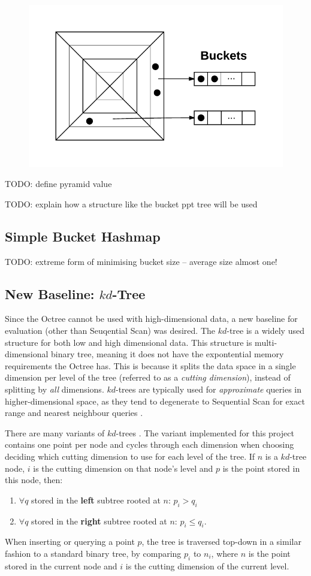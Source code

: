 \begin{figure}
\begin{center}
\begin{subfloat} {%
				\includegraphics[scale=0.5]{figures/pyramid_tree_buckets.pdf}
			}
			\end{subfloat}
		\end{center}

		\label{fig:pyramid-tree-partition}
\end{figure}

TODO: define pyramid value

TODO: explain how a structure like the bucket ppt tree will be used

\subsection{Simple Bucket Hashmap}

TODO: extreme form of minimising bucket size -- average size almost one!

\subsection{New Baseline: $kd$-Tree}

Since the Octree cannot be used with high-dimensional data, a new baseline for evaluation (other than Seuqential Scan) was desired. The $kd$-tree is a widely used structure for both low and high dimensional data. This structure is multi-dimensional binary tree, meaning it does not have the expontential memory requirements the Octree has. This is because it splits the data space in a single dimension per level of the tree (referred to as a \textit{cutting dimension}), instead of splitting by \textit{all} dimensions. $kd$-trees are typically used for \textit{approximate} queries in higher-dimensional space, as they tend to degenerate to Sequential Scan for exact range and nearest neighbour queries \cite{similarity-searching}.

There are many variants of $kd$-trees \cite{kd-tree, bkd-tree, kdb-tree}. The variant implemented for this project contains one point per node and cycles through each dimension when choosing deciding which cutting dimension to use for each level of the tree. If $n$ is a $kd$-tree node, $i$ is the cutting dimension on that node's level and $p$ is the point stored in this node, then:
\begin{enumerate}
	\item $\forall q$ stored in the \textbf{left} subtree rooted at $n$: $p_i > q_i$ 
	\item $\forall q$ stored in the \textbf{right} subtree rooted at $n$: $p_i \leq q_i$.
\end{enumerate}
When inserting or querying a point $p$, the tree is traversed top-down in a similar fashion to a standard binary tree, by comparing $p_i$ to $n_i$, where $n$ is the point stored in the current node and $i$ is the cutting dimension of the current level.

